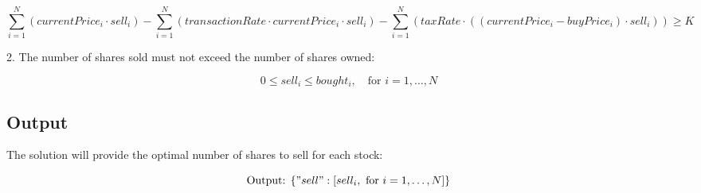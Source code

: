 \documentclass{article}
\begin{document}
\[
\sum_{i=1}^{N} (currentPrice_i \cdot sell_i) - \sum_{i=1}^{N} \left( transactionRate \cdot currentPrice_i \cdot sell_i \right) - \sum_{i=1}^{N} \left( taxRate \cdot \left( (currentPrice_i - buyPrice_i) \cdot sell_i \right) \right) \geq K
\]

2. The number of shares sold must not exceed the number of shares owned:

\[
0 \leq sell_i \leq bought_i, \quad \text{for } i = 1, \ldots, N
\]

\subsection*{Output}
The solution will provide the optimal number of shares to sell for each stock:

\[
\text{Output: } \{ "sell": [sell_i, \text{ for } i = 1, \ldots, N] \}
\]
\end{document}
